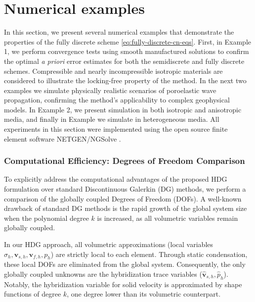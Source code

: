 \documentclass[10pt,letterpaper]{amsart}
\theoremstyle{plain} %
\theoremstyle{remark} %
\newcommand{\vect}[1]{\mathbf{#1}}
\begin{document}
%

\section{Numerical examples}
\label{sec:num_test}
{
In this section, we present several numerical examples that demonstrate the properties of the fully discrete scheme \eqref{eq:fully-discrete-cn-eqs}. First, in Example 1, we perform convergence tests using smooth manufactured solutions to confirm the optimal \textit{a priori} error estimates for both the semidiscrete and fully discrete schemes. Compressible and nearly incompressible isotropic materials are considered to illustrate the locking-free property of the method. In the next two examples we simulate physically realistic scenarios of poroelastic wave propagation, confirming the method's applicability to complex geophysical models. In Example 2, we present simulation in both isotropic and anisotropic media, and finally in Example we simulate in heterogeneous media. All experiments in this section were implemented using the open source finite element software NETGEN/NGSolve \cite{schoberl1997netgen,schoberl2014c++}.
}



\subsubsection*{Computational Efficiency: Degrees of Freedom Comparison}


To explicitly address the computational advantages of the proposed HDG formulation over standard Discontinuous Galerkin (DG) methods, we perform a comparison of the globally coupled Degrees of Freedom (DOFs). A well-known drawback of standard DG methods is the rapid growth of the global system size when the polynomial degree $k$ is increased, as all volumetric variables remain globally coupled.

In our HDG approach, all volumetric approximations (local variables $\sigma_h, \vect{v}_{s,h}, \vect{v}_{f,h}, p_h$) are strictly local to each element. Through static condensation, these local DOFs are eliminated from the global system. Consequently, the only globally coupled unknowns are the hybridization trace variables ($\widehat{\vect{v}}_{s,h}, \widehat{p}_h$). Notably, the hybridization variable for solid velocity is approximated by shape functions of degree $k$, one degree lower than its volumetric counterpart.
\end{document}
